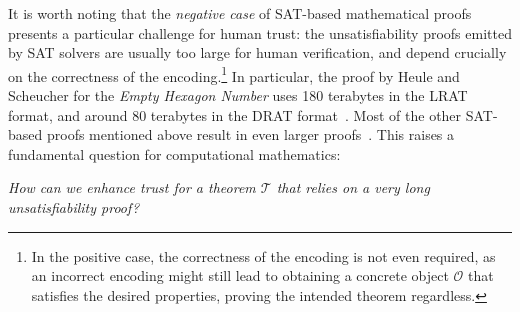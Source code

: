 It is worth noting that the \emph{negative case} of SAT-based mathematical proofs presents a particular challenge for human trust: the unsatisfiability proofs emitted by SAT solvers are usually too large for human verification, and depend crucially on the correctness of the encoding.\footnote{In the positive case, the correctness of the encoding is not even required, as an incorrect encoding might still lead to obtaining a concrete object $\mathcal{O}$ that satisfies the desired properties, proving the intended theorem regardless.}
In particular, the proof by Heule and Scheucher for the \emph{Empty Hexagon Number} uses 180 terabytes in the \textsf{LRAT} format, and around 80 terabytes in the \textsf{DRAT} format~\cite{emptyHexagonNumber}. Most of the other SAT-based proofs mentioned above result in even larger proofs~\cite{Heule_2016,lambTwohundredterabyteMathsProof2016,heule2017schur,Subercaseaux_Heule_2023}.
This raises a fundamental question for computational mathematics:
\begin{center}
  \emph{How can we enhance trust for a theorem $\mathcal{T}$ that relies on a very long unsatisfiability proof?}
\end{center}

